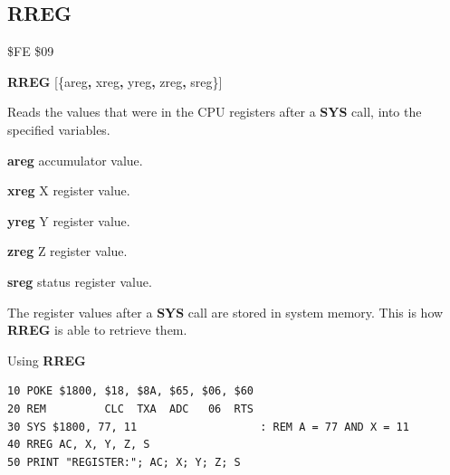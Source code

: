 
\newpage
\subsection{RREG}
\begin{description}[leftmargin=2cm,style=nextline]
\item [Token:]    \$FE \$09

\item [Format:]   {\bf RREG} [\{areg{\bf,} xreg{\bf,} yreg{\bf,} zreg{\bf,} sreg\}]

\item [Usage:]    Reads the values that were in the CPU registers after a {\bf SYS} call, into the specified variables.

                  {\bf areg} accumulator value.

                  {\bf xreg} X register value.

                  {\bf yreg} Y register value.

                  {\bf zreg} Z register value.

                  {\bf sreg} status register value.

\item [Remarks:]  The register values after a {\bf SYS} call are stored in system memory. This is how {\bf RREG} is able to retrieve them.

\item [Example:]  Using {\bf RREG}
\begin{tcolorbox}[colback=black,coltext=white]
\verbatimfont{\codefont}
\begin{verbatim}
10 POKE $1800, $18, $8A, $65, $06, $60
20 REM         CLC  TXA  ADC   06  RTS
30 SYS $1800, 77, 11                   : REM A = 77 AND X = 11
40 RREG AC, X, Y, Z, S
50 PRINT "REGISTER:"; AC; X; Y; Z; S
\end{verbatim}
\end{tcolorbox}
\end{description}


\newpage
